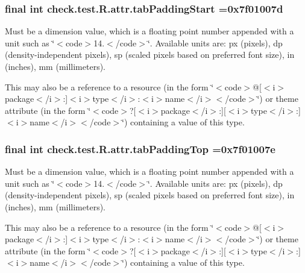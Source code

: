 \subsubsection[{tab\+Padding\+Start}]{\setlength{\rightskip}{0pt plus 5cm}final int check.\+test.\+R.\+attr.\+tab\+Padding\+Start =0x7f01007d\hspace{0.3cm}{\ttfamily [static]}}\label{classcheck_1_1test_1_1_r_1_1attr_a196c7359dff257a9caccdbaa14a63e0b}
Must be a dimension value, which is a floating point number appended with a unit such as \char`\"{}$<$code$>$14.\+5sp$<$/code$>$\char`\"{}. Available units are\+: px (pixels), dp (density-\/independent pixels), sp (scaled pixels based on preferred font size), in (inches), mm (millimeters). 

This may also be a reference to a resource (in the form \char`\"{}$<$code$>$@\mbox{[}$<$i$>$package$<$/i$>$\+:\mbox{]}$<$i$>$type$<$/i$>$\+:$<$i$>$name$<$/i$>$$<$/code$>$\char`\"{}) or theme attribute (in the form \char`\"{}$<$code$>$?\mbox{[}$<$i$>$package$<$/i$>$\+:\mbox{]}\mbox{[}$<$i$>$type$<$/i$>$\+:\mbox{]}$<$i$>$name$<$/i$>$$<$/code$>$\char`\"{}) containing a value of this type. \hypertarget{classcheck_1_1test_1_1_r_1_1attr_a85de95c6d92d95bb3ca0cc41458d1e48}{}
\subsubsection[{tab\+Padding\+Top}]{\setlength{\rightskip}{0pt plus 5cm}final int check.\+test.\+R.\+attr.\+tab\+Padding\+Top =0x7f01007e\hspace{0.3cm}{\ttfamily [static]}}\label{classcheck_1_1test_1_1_r_1_1attr_a85de95c6d92d95bb3ca0cc41458d1e48}
Must be a dimension value, which is a floating point number appended with a unit such as \char`\"{}$<$code$>$14.\+5sp$<$/code$>$\char`\"{}. Available units are\+: px (pixels), dp (density-\/independent pixels), sp (scaled pixels based on preferred font size), in (inches), mm (millimeters). 

This may also be a reference to a resource (in the form \char`\"{}$<$code$>$@\mbox{[}$<$i$>$package$<$/i$>$\+:\mbox{]}$<$i$>$type$<$/i$>$\+:$<$i$>$name$<$/i$>$$<$/code$>$\char`\"{}) or theme attribute (in the form \char`\"{}$<$code$>$?\mbox{[}$<$i$>$package$<$/i$>$\+:\mbox{]}\mbox{[}$<$i$>$type$<$/i$>$\+:\mbox{]}$<$i$>$name$<$/i$>$$<$/code$>$\char`\"{}) containing a value of this type. \hypertarget{classcheck_1_1test_1_1_r_1_1attr_a270a1ff857735c964f5bcf59290f4b71}{}
